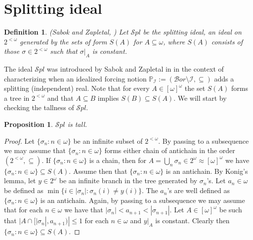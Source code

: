 \documentclass[a4paper]{amsart}
\newtheorem{proposition}[theorem]{Proposition}
\newtheorem{definition}[theorem]{Definition}
\newcommand{\Cantor}{2^{\omega}}
\newcommand{\cantor}{2^{<\omega}}
\newcommand{\I}{\mathcal{I}}
\newcommand{\SPL}{\mathcal{S}pl}
\begin{document}
\section{Splitting ideal}
\begin{definition}(Sabok and Zapletal, \cite{SabZapl})\index{Ideal!$\SPL$}
    Let $\SPL$ be the splitting ideal, an ideal on $\cantor$ generated by the sets of form $S(A)$ for $A\subseteq\omega$, where $S(A)$ consists of those $\sigma\in\cantor$ such that $\sigma|_{A}$ is constant.
    \end{definition}
    The ideal $\SPL$ was introduced by Sabok and Zapletal in \cite{SabZapl} in the context of characterizing when an idealized forcing notion $\mathbb{P}_{\I}:=(\mathcal{B}or\setminus\I,\subseteq)$ adds a splitting (independent) real. Note that for every $A\in[\omega]^{\omega}$ the set $S(A)$ forms a tree in $\cantor$ and that $A\subseteq B$ implies $S(B)\subseteq S(A)$. We will start by checking the tallness of $\SPL$.
    \begin{proposition}
        $\SPL$ is tall.
    \end{proposition}
    \begin{proof}
        Let $\{\sigma_{n}:n\in\omega\}$ be an infinite subset of $2^{<\omega}$. By passing to a subsequence we may assume that $\{\sigma_{n}:n\in\omega\}$ forms either chain of antichain in the order $(2^{<\omega},\subseteq)$. If $\{\sigma_{n}:n\in\omega\}$ is a chain, then for $A=\bigcup_{n}\sigma_{n}\in\Cantor\approx[\omega]^{\omega}$ we have $\{\sigma_{n}:n\in\omega\}\subseteq S(A)$. Assume then that $\{\sigma_{n}:n\in\omega\}$ is an antichain. By Konig's lemma, let $y\in\Cantor$ be an infinite branch in the tree generated by $\sigma_{n}$'s. Let $a_{n}\in\omega$ be defined as $\min\{i\in|\sigma_{n}|:\sigma_{n}(i)\neq y(i)\}$. The $a_{n}$'s are well defined as $\{\sigma_{n}:n\in\omega\}$ is an antichain. Again, by passing to a subsequence we may assume that for each $n\in\omega$ we have that $|\sigma_{n}|<a_{n+1}<|\sigma_{n+1}|$. Let $A\in[\omega]^{\omega}$ be such that $|A\cap[|\sigma_{n}|,a_{n+1})|\leq 1$ for each $n\in\omega$ and $y|_{A}$ is constant. Clearly then $\{\sigma_{n}:n\in\omega\}\subseteq S(A)$.
    \end{proof}
    
\end{document}

